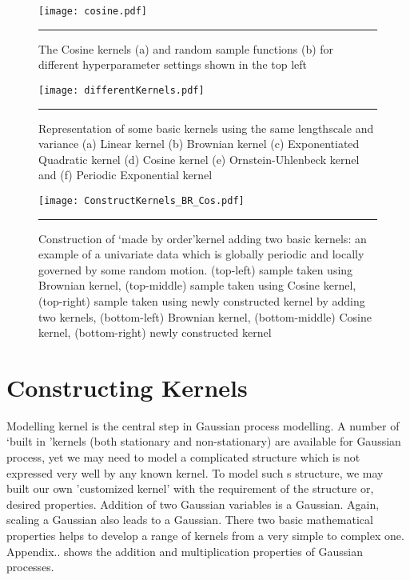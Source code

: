 \begin{figure}[t]
	\centering
		\texttt{[image: cosine.pdf]}
		\rule{35em}{0.5pt}
	\caption[The Cosine kernels and random sample functions]
		{The Cosine kernels (a) and random sample functions (b) for different hyperparameter settings shown in the top left}
	\label{fig:cosine_covariance}
\end{figure}


\begin{figure}[t]
	\centering
		\texttt{[image: differentKernels.pdf]}
		\rule{35em}{0.5pt}
	\caption[Representation of some basic kernels ]
		{Representation of some basic kernels using the same lengthscale and variance (a) Linear kernel (b) Brownian kernel (c) Exponentiated Quadratic kernel (d) Cosine kernel (e) Ornstein-Uhlenbeck kernel and (f) Periodic Exponential kernel}
	\label{fig:DifferentKernels}
\end{figure}

\begin{figure}[t]
	\centering
		\texttt{[image: ConstructKernels\_BR\_Cos.pdf]}
		\rule{35em}{0.5pt}
	\caption[Construction of a new kernel adding two basic kernels]
		{Construction of \lq made by order\rq kernel adding two basic kernels: an example of a univariate data which is globally periodic and locally governed by some random motion. (top-left) sample taken using Brownian kernel, (top-middle) sample taken using Cosine kernel, (top-right) sample taken using newly constructed kernel by adding two kernels, (bottom-left) Brownian kernel, (bottom-middle) Cosine kernel, (bottom-right) newly constructed kernel} %
	\label{fig:ConstructKernels_BR_Cos}
\end{figure}

\section{Constructing Kernels}

Modelling kernel is the central step in Gaussian process modelling. A number of \lq built in \rq kernels (both stationary and non-stationary) are available for Gaussian process, yet we may need to model a complicated structure which is not expressed very well by any known kernel. To model such s structure, we may built our own 'customized kernel' with the requirement of the structure or, desired properties. Addition of two Gaussian variables is a Gaussian. Again, scaling a Gaussian also leads to a Gaussian. There two basic mathematical properties helps to develop a range of kernels from a very simple to complex one.{ \color{red} Appendix..   } shows the addition and multiplication properties of Gaussian processes. 

